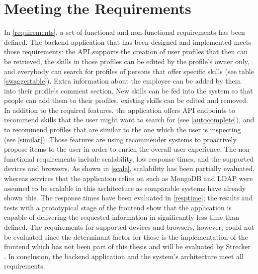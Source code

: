\section{Meeting the Requirements}
In \ref{requirements}, a set of functional and non-functional requirements has been defined. The backend application that has been designed and implemented meets those requirements: the API supports the creation of user profiles that then can be retrieved, the skills in those profiles can be edited by the profile's owner only, and everybody can search for profiles of persons that offer specific skills (see table \ref{swaggertable}). Extra information about the employee can be added by them into their profile's comment section. New skills can be fed into the system so that people can add them to their profiles, existing skills can be edited and removed. In addition to the required features, the application offers API endpoints to recommend skills that the user might want to search for (see \ref{autocomplete}), and
to recommend profiles that are similar to the one which the user is inspecting (see \ref{similar}). Those features are using recommender systems to
proactively propose items to the user in order to enrich the overall user experience.\newline
The non-functional requirements include scalability, low response times, and the supported devices and browsers.
As shown in \ref{scale}, scalability has been partially evaluated, whereas services that the application relies on such as MongoDB and LDAP were assumed to be scalable in this architecture as comparable systems have already shown this. The response times have been evaluated in \ref{resptime}; the results and tests with a prototypical stage of the frontend show that the application is capable of delivering the requested information in significantly less time than defined.
The requirements for supported devices and browsers, however, could not be evaluated since the determinant factor for those is the implementation of the frontend which has not been part of this thesis and will be evaluated by Strecker \cite{strecker}. In conclusion, the backend application and the system's architecture meet all requirements.
